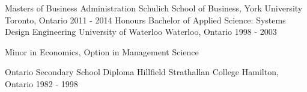 

\begin{cventries}

  \cventry
    {Masters of Business Administration} %
    {Schulich School of Business, York University} %
    {Toronto, Ontario} %
    {2011 - 2014} %
    {}
  \cventry
    {Honours Bachelor of Applied Science: Systems Design Engineering} %
    {University of Waterloo} %
    {Waterloo, Ontario} %
    {1998 - 2003} %
    {
    \begin{cvitems} %
      \item {Minor in Economics, Option in Management Science}
    \end{cvitems}
    }

  \cventry
    {Ontario Secondary School Diploma} %
    {Hillfield Strathallan College} %
    {Hamilton, Ontario} %
    {1982 - 1998} %
    {}  

\end{cventries}  